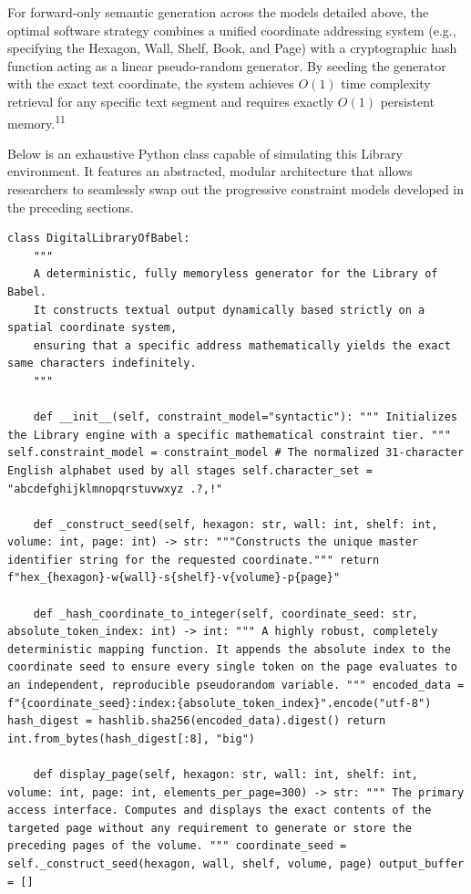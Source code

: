 \documentclass[
  11pt,
  a4paper,
]{article}
\begin{document}
For forward-only semantic generation across the models detailed above, the optimal software strategy combines a unified coordinate addressing system (e.g., specifying the Hexagon, Wall, Shelf, Book, and Page) with a cryptographic hash function acting as a linear pseudo-random generator. By seeding the generator with the exact text coordinate, the system achieves \(O(1)\) time complexity retrieval for any specific text segment and requires exactly \(O(1)\) persistent memory.\textsuperscript{11}

Below is an exhaustive Python class capable of simulating this Library environment. It features an abstracted, modular architecture that allows researchers to seamlessly swap out the progressive constraint models developed in the preceding sections.

\begin{lstlisting}[style=babelpython]
class DigitalLibraryOfBabel:
    """
    A deterministic, fully memoryless generator for the Library of Babel.
    It constructs textual output dynamically based strictly on a spatial coordinate system,
    ensuring that a specific address mathematically yields the exact same characters indefinitely.
    """

    def __init__(self, constraint_model="syntactic"): """ Initializes the Library engine with a specific mathematical constraint tier. """ self.constraint_model = constraint_model # The normalized 31-character English alphabet used by all stages self.character_set = "abcdefghijklmnopqrstuvwxyz .?,!"

    def _construct_seed(self, hexagon: str, wall: int, shelf: int, volume: int, page: int) -> str: """Constructs the unique master identifier string for the requested coordinate.""" return f"hex_{hexagon}-w{wall}-s{shelf}-v{volume}-p{page}"

    def _hash_coordinate_to_integer(self, coordinate_seed: str, absolute_token_index: int) -> int: """ A highly robust, completely deterministic mapping function. It appends the absolute index to the coordinate seed to ensure every single token on the page evaluates to an independent, reproducible pseudorandom variable. """ encoded_data = f"{coordinate_seed}:index:{absolute_token_index}".encode("utf-8") hash_digest = hashlib.sha256(encoded_data).digest() return int.from_bytes(hash_digest[:8], "big")

    def display_page(self, hexagon: str, wall: int, shelf: int, volume: int, page: int, elements_per_page=300) -> str: """ The primary access interface. Computes and displays the exact contents of the targeted page without any requirement to generate or store the preceding pages of the volume. """ coordinate_seed = self._construct_seed(hexagon, wall, shelf, volume, page) output_buffer = []


\end{lstlisting}
\end{document}
